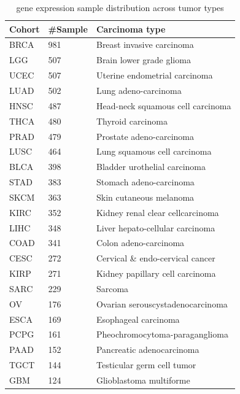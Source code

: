 \iffalse
\begin{table} [!ht] 
    \begin{center}
    \scriptsize
    \caption{gene expression sample distribution across tumor types}
        \vspace{-2mm}
    \label{table:GE_dist}
    \begin{tabular}{l|l|l}
        \toprule
         \textbf{Cohort} & \textbf{\#Sample} & \textbf{Carcinoma type} \\\midrule
         BRCA & 981  & Breast invasive carcinoma  \\%
         LGG  & 507  & Brain lower grade glioma \\%
         UCEC & 507  & Uterine endometrial carcinoma \\%
         LUAD & 502  & Lung adeno-carcinoma \\%
         HNSC & 487  & Head-neck squamous cell carcinoma \\%
         THCA & 480  & Thyroid carcinoma \\%
         PRAD & 479  & Prostate adeno-carcinoma \\%
         LUSC & 464  & Lung squamous cell carcinoma \\%
         BLCA & 398  & Bladder urothelial carcinoma \\%
         STAD & 383  & Stomach adeno-carcinoma \\%
         SKCM & 363  & Skin cutaneous melanoma \\%
         KIRC & 352  & Kidney renal clear cellcarcinoma  \\%
         LIHC & 348  & Liver hepato-cellular carcinoma	\\%
         COAD & 341  & Colon adeno-carcinoma \\%
         CESC & 272  & Cervical \& endo-cervical cancer \\%
         KIRP & 271  & Kidney papillary cell carcinoma	\\%
         SARC & 229  & Sarcoma \\%
         OV   & 176  & Ovarian serouscystadenocarcinoma \\%
         ESCA & 169  & Esophageal carcinoma \\%
         PCPG & 161  & Pheochromocytoma-paraganglioma \\%
         PAAD & 152  & Pancreatic adenocarcinoma	\\%
         TGCT & 144  & Testicular germ cell tumor \\%
         GBM  & 124  & Glioblastoma multiforme \\%

\end{tabular}
\end{center}
\end{table}
